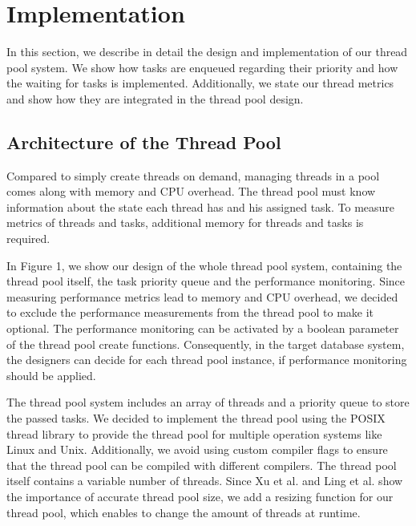 \documentclass[conference]{IEEEtran}
\begin{document}
\section{Implementation}
In this section, we describe in detail the design and implementation of our thread pool system. We show how tasks are enqueued regarding their priority and how the waiting for tasks is implemented. Additionally, we state our thread metrics and show how they are integrated in the thread pool design.

\subsection{Architecture of the Thread Pool}
Compared to simply create threads on demand, managing threads in a pool comes along with memory and CPU overhead. The thread pool must know information about the state each thread has and his assigned task. To measure metrics of threads and tasks, additional memory for threads and tasks is required.

In Figure 1, we show our design of the whole thread pool system, containing the thread pool itself, the task priority queue and the performance monitoring. Since measuring performance metrics lead to memory and CPU overhead, we decided to exclude the performance measurements from the thread pool to make it optional. The performance monitoring can be activated by a boolean parameter of the thread pool create functions. Consequently, in the target database system, the designers can decide for each thread pool instance, if performance monitoring should be applied.

The thread pool system includes an array of threads and a priority queue to store the passed tasks. We decided to implement the thread pool using the POSIX thread library to provide the thread pool for multiple operation systems like Linux and Unix. Additionally, we avoid using custom compiler flags to ensure that the thread pool can be compiled with different compilers. The thread pool itself contains a variable number of threads. Since Xu et al. \cite{xu2004performance} and Ling et al. \cite{ling2000analysis} show the importance of accurate thread pool size, we add a resizing function for our thread pool, which enables to change the amount of threads at runtime.
\end{document}
